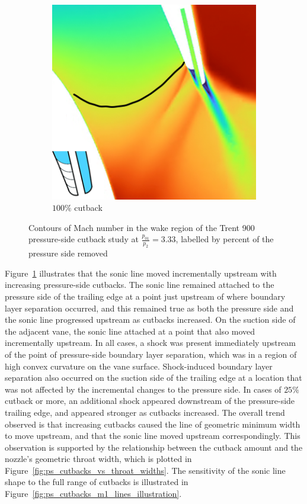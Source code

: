 \documentclass[a4paper, 11pt, oneside]{report}
\begin{document}
\begin{figure}[H]
\begin{subfigure}{.15\textwidth}
	\end{subfigure}
	\begin{subfigure}{.42\textwidth}
		\centering
		\includegraphics[width=\linewidth]{figs/ps_cutbacks_choked_100.png}
		\caption{$100\%$ cutback}
	\end{subfigure}
	\caption{Contours of Mach number in the wake region of the Trent 900 pressure-side cutback study at $\frac{p_{01}}{p_2}=3.33$, labelled by percent of the pressure side removed}
	\label{fig:ps_cutbacks_choked}
\end{figure}

\newpage
Figure~\ref{fig:ps_cutbacks_choked} illustrates that the sonic line moved incrementally upstream with increasing pressure-side cutbacks. The sonic line remained attached to the pressure side of the trailing edge at a point just upstream of where boundary layer separation occurred, and this remained true as both the pressure side and the sonic line progressed upstream as cutbacks increased. On the suction side of the adjacent vane, the sonic line attached at a point that also moved incrementally upstream. In all cases, a shock was present immediately upstream of the point of pressure-side boundary layer separation, which was in a region of high convex curvature on the vane surface. Shock-induced boundary layer separation also occurred on the suction side of the trailing edge at a location that was not affected by the incremental changes to the pressure side. In cases of $25\%$ cutback or more, an additional shock appeared downstream of the pressure-side trailing edge, and appeared stronger as cutbacks increased. The overall trend observed is that increasing cutbacks caused the line of geometric minimum width to move upstream, and that the sonic line moved upstream correspondingly. This observation is supported by the relationship between the cutback amount and the nozzle's geometric throat width, which is plotted in Figure~\ref{fig:ps_cutbacks_vs_throat_widths}. The sensitivity of the sonic line shape to the full range of cutbacks is illustrated in Figure~\ref{fig:ps_cutbacks_m1_lines_illustration}.
\end{document}
